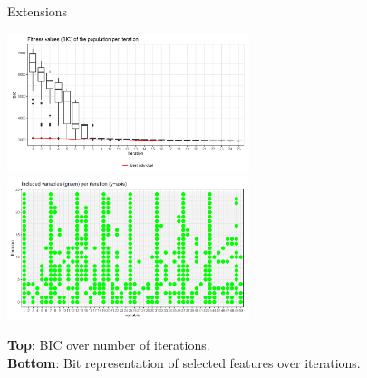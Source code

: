 \documentclass[11pt,compress,t,notes=noshow, xcolor=table]{beamer}
\begin{document}
\begin{vbframe}{Extensions}
\vspace{-0.3cm}
        \begin{center}
        \includegraphics[width=0.53\textwidth]{figure/var-selection1.png}
        \includegraphics[width=0.53\textwidth]{figure/var-selection2.png}
     \end{center}
    \vspace{-0.5cm}
\textbf{Top}: BIC over number of iterations.\\
\textbf{Bottom}: Bit representation of selected features over iterations.
\end{vbframe}



\end{document}
